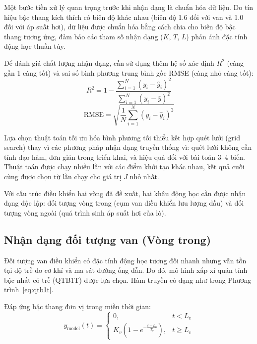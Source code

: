 \documentclass[../main.tex]{subfiles}
\begin{document}
Một bước tiền xử lý quan trọng trước khi nhận dạng là chuẩn hóa dữ liệu. Do tín hiệu bậc thang kích thích có biên độ khác nhau (biên độ 1.6 đối với van và 1.0 đối với áp suất hơi), dữ liệu được chuẩn hóa bằng cách chia cho biên độ bậc thang tương ứng, đảm bảo các tham số nhận dạng ($K$, $T$, $L$) phản ánh đặc tính động học thuần túy.

Để đánh giá chất lượng nhận dạng, cần sử dụng thêm hệ số xác định $R^2$ (càng gần 1 càng tốt) và sai số bình phương trung bình gốc RMSE (càng nhỏ càng tốt):
\begin{equation}
    R^2 = 1 - \frac{\sum_{i=1}^{N}(y_i - \hat{y}_i)^2}{\sum_{i=1}^{N}(y_i - \bar{y})^2}
\end{equation}
\begin{equation}
    \text{RMSE} = \sqrt{\frac{1}{N}\sum_{i=1}^{N}(y_i - \hat{y}_i)^2}
\end{equation}

Lựa chọn thuật toán tối ưu hóa bình phương tối thiểu kết hợp quét lưới (grid search) thay vì các phương pháp nhận dạng truyền thống vì: quét lưới không cần tính đạo hàm, đơn giản trong triển khai, và hiệu quả đối với bài toán 3--4 biến. Thuật toán được chạy nhiều lần với các điểm khởi tạo khác nhau, kết quả cuối cùng được chọn từ lần chạy cho giá trị $J$ nhỏ nhất.

Với cấu trúc điều khiển hai vòng đã đề xuất, hai khâu động học cần được nhận dạng độc lập: đối tượng vòng trong (cụm van điều khiển lưu lượng dầu) và đối tượng vòng ngoài (quá trình sinh áp suất hơi của lò).

\subsection{Nhận dạng đối tượng van (Vòng trong)}

Đối tượng van điều khiển có đặc tính động học tương đối nhanh nhưng vẫn tồn tại độ trễ do cơ khí và ma sát đường ống dẫn. Do đó, mô hình xấp xỉ quán tính bậc nhất có trễ (QTB1T) được lựa chọn. Hàm truyền có dạng như trong Phương trình~\ref{eq:qtb1t}.

Đáp ứng bậc thang đơn vị trong miền thời gian:
\begin{equation}
    y_{\mathrm{model}}(t) =
    \begin{cases}
        0, & t < L_v \\[4pt]
        K_v\!\left(1 - e^{-\frac{t - L_v}{T_v}}\right), & t \geq L_v
    \end{cases}
    \label{eq:qtb1t_step}
\end{equation}
\end{document}
